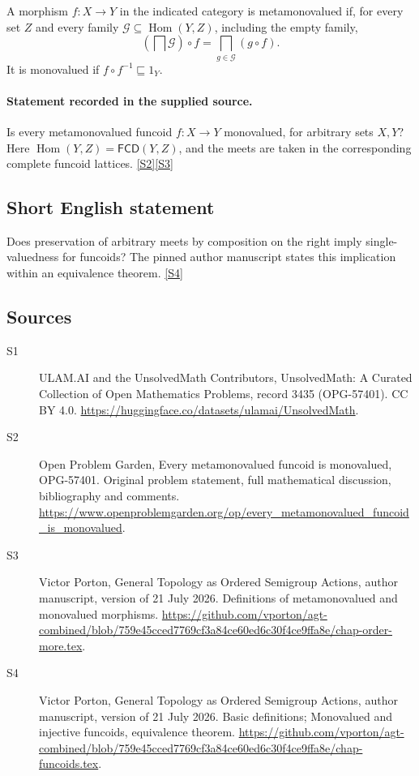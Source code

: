 \documentclass[11pt]{article}
\newcommand{\sref}[2]{\hyperlink{source:#1:#2}{[S#2]}}
\begin{document}
A morphism $f:X\to Y$ in the indicated category is metamonovalued if, for every set $Z$ and every family $\mathcal G\subseteq\operatorname{Hom}(Y,Z)$, including the empty family,
\[
 \left(\bigsqcap\mathcal G\right)\circ f
 =\bigsqcap_{g\in\mathcal G}(g\circ f).
\]
It is monovalued if $f\circ f^{-1}\sqsubseteq1_Y$.
\paragraph{Statement recorded in the supplied source.}
Is every metamonovalued funcoid $f:X\to Y$ monovalued, for arbitrary sets $X,Y$? Here $\operatorname{Hom}(Y,Z)=\mathsf{FCD}(Y,Z)$, and the meets are taken in the corresponding complete funcoid lattices. \sref{3435}{2}\sref{3435}{3}
\subsection{Short English statement}
Does preservation of arbitrary meets by composition on the right imply single-valuedness for funcoids? The pinned author manuscript states this implication within an equivalence theorem. \sref{3435}{4}
\subsection{Sources}
\begin{description}
\item[\hypertarget{source:3435:1}{S1}] ULAM.AI and the UnsolvedMath Contributors, UnsolvedMath: A Curated Collection of Open Mathematics Problems, record 3435 (OPG-57401). CC BY 4.0. \url{https://huggingface.co/datasets/ulamai/UnsolvedMath}.
\item[\hypertarget{source:3435:2}{S2}] Open Problem Garden, Every metamonovalued funcoid is monovalued, OPG-57401. Original problem statement, full mathematical discussion, bibliography and comments. \url{https://www.openproblemgarden.org/op/every_metamonovalued_funcoid_is_monovalued}.
\item[\hypertarget{source:3435:3}{S3}] Victor Porton, General Topology as Ordered Semigroup Actions, author manuscript, version of 21 July 2026. Definitions of metamonovalued and monovalued morphisms. \url{https://github.com/vporton/agt-combined/blob/759e45cced7769cf3a84ce60ed6c30f4ce9ffa8e/chap-order-more.tex}.
\item[\hypertarget{source:3435:4}{S4}] Victor Porton, General Topology as Ordered Semigroup Actions, author manuscript, version of 21 July 2026. Basic definitions; Monovalued and injective funcoids, equivalence theorem. \url{https://github.com/vporton/agt-combined/blob/759e45cced7769cf3a84ce60ed6c30f4ce9ffa8e/chap-funcoids.tex}.
\end{description}
\label{end:3435}
\end{document}
